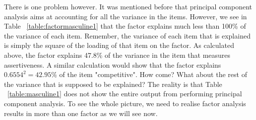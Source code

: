 \documentclass[a4paper,12pt,oneside]{book}
\begin{document}
There is one problem however. It was mentioned before that principal component analysis aims at accounting for all the variance in the items. However,
we see in Table ~\ref{table:factormasculine1} that the factor explains much less than 100\% of the variance of each item. Remember, the variance
of each item that is explained is simply the square of the loading of that item on the factor. As calculated above, the factor explains 47.8\% of
the variance in the item that measures assertiveness. A similar calculation would show that the factor explains $0.6554^2=42.95\%$ of the item 
"competitive". How come? What about the rest of the variance that is supposed to be explained? The reality is that Table ~\ref{table:masculine1} 
does not show the entire output from performing principal component analysis. To see the whole picture, we need to realise factor analysis results
in more than one factor as we will see now.
\end{document}
